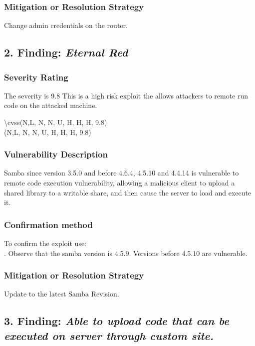 \documentclass[notitlepage]{article}
\begin{document}
	\subsubsection{Mitigation or Resolution Strategy}
	\indent Change admin credentials on the router.  \\
	
		
	\subsection{2. Finding: \emph{Eternal Red}}
	
	\subsubsection{Severity Rating}
	\indent The severity is 9.8 This is a high risk exploit the allows attackers to remote run code on the attacked machine. 
	
	\textbackslash cvss(N,L, N, N, U, H, H, H, 9.8)\\
	\cvss(N,L, N, N, U, H, H, H, 9.8) \\
	
	\subsubsection{Vulnerability Description}
	\indent Samba since version 3.5.0 and before 4.6.4, 4.5.10 and 4.4.14 is vulnerable to remote code execution vulnerability, allowing a malicious client to upload a shared library to a writable share, and then cause the server to load and execute it.
	
	\subsubsection{Confirmation method}
	To confirm the exploit use: \\
	. Observe that the samba version is 4.5.9. Versions before 4.5.10 are vulnerable. 
	
	\subsubsection{Mitigation or Resolution Strategy}
	\indent Update to the latest Samba Revision.  
	
	
	\subsection{3. Finding: \emph{Able to upload code that can be executed on server through custom site. }}
	
\end{document}
